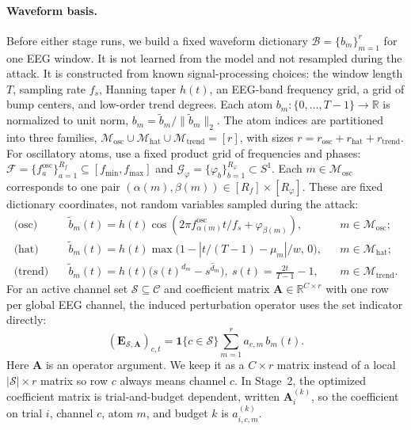 \documentclass[11pt]{article}
\begin{document}
\paragraph{Waveform basis.}
Before either stage runs, we build a fixed waveform dictionary
$\mathcal{B}=\{b_m\}_{m=1}^{r}$ for one EEG window. It is not learned from the model and
not resampled during the attack. It is constructed from known signal-processing choices:
the window length $T$, sampling rate $f_s$, Hanning taper $h(t)$, an EEG-band frequency
grid, a grid of bump centers, and low-order trend degrees. Each atom
$b_m:\{0,\dots,T-1\}\to\mathbb{R}$ is normalized to unit norm,
$b_m=\tilde b_m/\|\tilde b_m\|_2$. The atom indices are partitioned into three families,
$\mathcal{M}_{\mathrm{osc}}\cup\mathcal{M}_{\mathrm{hat}}\cup
\mathcal{M}_{\mathrm{trend}}=[r]$, with sizes
$r=r_{\mathrm{osc}}+r_{\mathrm{hat}}+r_{\mathrm{trend}}$. For oscillatory atoms, use a
fixed product grid of frequencies and phases:
$\mathcal{F}=\{f_a^{\mathrm{osc}}\}_{a=1}^{R_f}\subseteq[f_{\min},f_{\max}]$ and
$\mathcal{G}_{\varphi}=\{\varphi_b\}_{b=1}^{R_\varphi}\subset S^1$. Each
$m\in\mathcal{M}_{\mathrm{osc}}$ corresponds to one pair
$(\alpha(m),\beta(m))\in[R_f]\times[R_\varphi]$. These are fixed dictionary coordinates,
not random variables sampled during the attack:
\begin{align}
\text{(osc)}\quad   &\tilde b_m(t)=h(t)\cos(2\pi f_{\alpha(m)}^{\mathrm{osc}} t/f_s+\varphi_{\beta(m)}),
&&m\in\mathcal{M}_{\mathrm{osc}};\\
\text{(hat)}\quad   &\tilde b_m(t)=h(t)\max\!\big(1-|t/(T-1)-\mu_m|/w,\,0\big),
&&m\in\mathcal{M}_{\mathrm{hat}};\\
\text{(trend)}\quad &\tilde b_m(t)=h(t)\big(s(t)^{d_m}-\overline{s^{d_m}}\big),\ s(t)=\tfrac{2t}{T-1}-1,
&&m\in\mathcal{M}_{\mathrm{trend}}.
\end{align}
For an active channel set $\mathcal{S}\subseteq\mathcal{C}$ and coefficient matrix
$\mathbf{A}\in\mathbb{R}^{C\times r}$ with one row per global EEG channel, the induced
perturbation operator uses the set indicator directly:
\begin{equation}\label{eq:param}
(\mathbf{E}_{\mathcal{S},\mathbf{A}})_{c,t}=
\mathbf{1}\{c\in \mathcal{S}\}\sum_{m=1}^{r} a_{c,m}\,b_m(t).
\end{equation}
Here $\mathbf{A}$ is an operator argument. We keep it as a $C\times r$ matrix instead of a
local $|\mathcal{S}|\times r$ matrix so row $c$ always means channel $c$. In Stage~2, the
optimized coefficient matrix is trial-and-budget dependent, written $\mathbf{A}_i^{(k)}$,
so the coefficient on trial $i$, channel $c$, atom $m$, and budget $k$ is
$a_{i,c,m}^{(k)}$.
\end{document}

